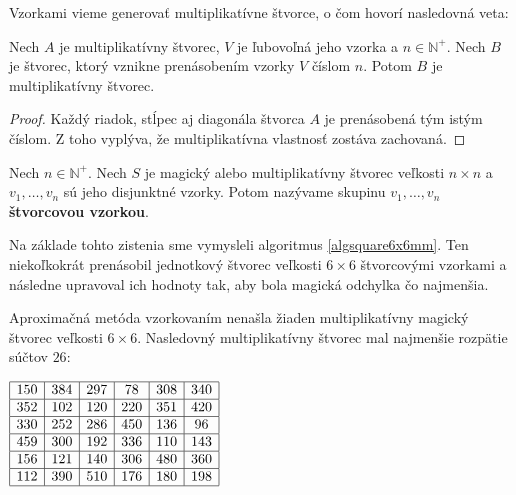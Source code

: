 Vzorkami vieme generovať multiplikatívne štvorce, o čom hovorí nasledovná veta:

\begin{theorem}
\label{addmultsquarepattern}
Nech $A$ je multiplikatívny štvorec, $V$ je ľubovoľná jeho vzorka a $n \in \mathbb{N^+}$. Nech $B$ je štvorec, ktorý vznikne prenásobením vzorky $V$ číslom $n$. Potom $B$ je multiplikatívny štvorec.
\end{theorem}

\begin{proof} Každý riadok, stĺpec aj diagonála štvorca $A$ je prenásobená tým istým číslom. Z toho vyplýva, že multiplikatívna vlastnosť zostáva zachovaná.
\end{proof}

\begin{definition} Nech $n \in \mathbb{N^+}$. Nech $S$ je magický alebo multiplikatívny štvorec veľkosti $n \times n$ a $v_1, \dots , v_n$ sú jeho disjunktné vzorky. Potom nazývame skupinu $v_1, \dots , v_n$ \textbf{štvorcovou vzorkou}.
\end{definition}

Na základe tohto zistenia sme vymysleli algoritmus \ref{algsquare6x6mm}. Ten niekoľkokrát prenásobil jednotkový štvorec veľkosti $6 \times 6$ štvorcovými vzorkami a následne upravoval ich hodnoty tak, aby bola magická odchylka čo najmenšia.

\begin{result} Aproximačná metóda vzorkovaním nenašla žiaden multiplikatívny magický štvorec veľkosti $6 \times 6$. Nasledovný multiplikatívny štvorec mal najmenšie rozpätie súčtov $26$:
\end{result}

\begin{center}
$\begin{array}{ |c|c|c|c|c|c| } 
\hline
150 & 384 & 297 & 78 & 308 & 340 \\ 
\hline
352 & 102 & 120 & 220 & 351 & 420 \\ 
\hline
330 & 252 & 286 & 450 & 136 & 96 \\ 
\hline
459 & 300 & 192 & 336 & 110 & 143 \\ 
\hline
156 & 121 & 140 & 306 & 480 & 360 \\ 
\hline
112 & 390 & 510 & 176 & 180 & 198 \\ 
\hline
\end{array}$
\end{center}

